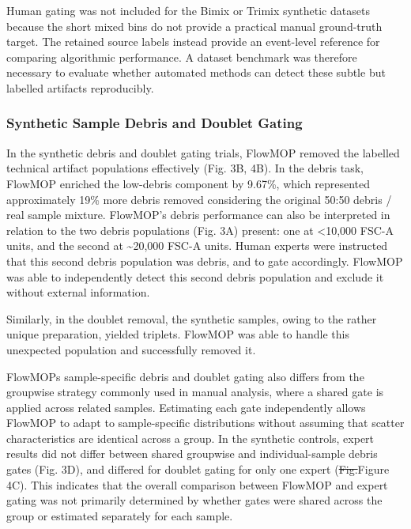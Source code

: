 \documentclass[ASNA]{latex/wiley/USG}
\begin{document}
Human gating was not included for the Bimix or Trimix synthetic datasets
because the short mixed bins do not provide a practical manual
ground-truth target. The retained source labels instead provide an
event-level reference for comparing algorithmic performance. A dataset
benchmark was therefore necessary to evaluate whether automated methods
can detect these subtle but labelled artifacts reproducibly.

\subsubsection{Synthetic Sample Debris and Doublet
Gating}\label{synthetic-sample-debris-and-doublet-gating}

In the synthetic debris and doublet gating trials, FlowMOP removed the
labelled technical artifact populations effectively (Fig. 3B, 4B). In
the debris task, FlowMOP enriched the low-debris component by 9.67\%,
which represented approximately 19\% more debris removed considering the
original 50:50 debris / real sample mixture. FlowMOP's debris
performance can also be interpreted in relation to the two debris
populations (Fig. 3A) present: one at \textless10,000 FSC-A units, and
the second at \textasciitilde20,000 FSC-A units. Human experts were
instructed that this second debris population was debris, and to gate
accordingly. FlowMOP was able to independently detect this second debris
population and exclude it without external information.

Similarly, in the doublet removal, the synthetic samples, owing to the
rather unique preparation, yielded triplets. FlowMOP was able to handle
this unexpected population and successfully removed it.

FlowMOP\textquotesingle s sample-specific debris and doublet gating also
differs from the groupwise strategy commonly used in manual analysis,
where a shared gate is applied across related samples. Estimating each
gate independently allows FlowMOP to adapt to sample-specific
distributions without assuming that scatter characteristics are
identical across a group. In the synthetic controls, expert results did
not differ between shared groupwise and individual-sample debris gates
(Fig. 3D), and differed for doublet gating for only one expert
({\color{revisionred}\sout{Fig.}}{\color{revisionblue}Figure} 4C). This
indicates that the overall comparison between FlowMOP and expert gating
was not primarily determined by whether gates were shared across the
group or estimated separately for each sample.
\end{document}

